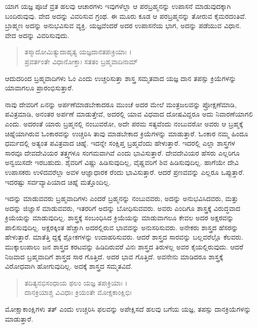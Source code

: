 ಯಾಗ ಯಜ್ಞ ಪೂಜೆ ವ್ರತ ಹಲವು ಆಚಾರಗಳು ಇವುಗಳೆಲ್ಲಾ ಆ ಪರಬ್ರಹ್ಮನನ್ನು ಉಪಾಸನೆ ಮಾಡುವುದಕ್ಕಾಗಿ ಬಂದಿರುವುವು. ವೇದ ಅದನ್ನು ವಿವರಿಸುವ ಗ್ರಂಥ. ಈ ಮೂರು ಕೂಡ ಆ ಪರಬ್ರಹ್ಮನನ್ನು ತೋರುವ ಕೈಮರದಂತಿವೆ. ಬ್ರಾಹ್ಮಣ ಅದನ್ನು ಅನುಭವಿಸುವ ವ್ಯಕ್ತಿ. ಯಜ್ಞವೆಂದರೆ ಅದರ ಉಪಾಸನೆಯ ಭಾಗ, ಅದನ್ನು ಪಡೆಯುವ ವಿಧಾನ. ವೇದ ಅದನ್ನು ವಿವರಿಸುವುದು.

\begin{verse}
ತಸ್ಮಾದೋಮಿತ್ಯುದಾಹೃತ್ಯ ಯಜ್ಞದಾನತಪಃಕ್ರಿಯಾಃ ।\\ಪ್ರವರ್ತಂತೇ ವಿಧಾನೋಕ್ತಾಃ ಸತತಂ ಬ್ರಹ್ಮವಾದಿನಾಮ್ 
\end{verse}

{\small ಆದುದರಿಂದ ಬ್ರಹ್ಮವಾದಿಗಳು ಓಂ ಎಂದು ಉಚ್ಚರಿಸುತ್ತಾ ಶಾಸ್ತ್ರ ಸಮ್ಮತವಾದ ಯಜ್ಞ ದಾನ ತಪಸ್ಸು ಕ್ರಿಯೆಗಳನ್ನು ಯಾವಾಗಲೂ ಪ್ರಾರಂಭಿಸುತ್ತಾರೆ.}

ನಾವು ದೇವರಿಗೆ ಏನನ್ನು ಅರ್ಪಣೆಮಾಡಬೇಕಾದರೂ ಮುಂಚೆ ಅದರ ಮೇಲೆ ಮಂತ್ರಜಲವನ್ನು ಪ್ರೋಕ್ಷಣೆಮಾಡಿ, ಪವಿತ್ರಮಾಡಿ, ಅನಂತರ ಅರ್ಪಣೆ ಮಾಡುತ್ತೇವೆ, ಅದರಲ್ಲಿ ಯಾವ ವಿಧವಾದ ದೋಷವಿದ್ದರೂ ಅದು ನಿವಾರಣೆಯಾಗಲಿ ಎಂದು. ಅದರಂತೆ ಯಾರು ಬ್ರಹ್ಮನಲ್ಲಿ ನಂಬುವರೋ, ಅದೇ ಪರಮ ಸತ್ಯವೆಂದು ನಂಬುವರೋ ಅವರು ಆ ಬ್ರಹ್ಮಕ್ಕೆ ಚಿಹ್ನೆಯಾಗಿರುವ ಓಂಕಾರವನ್ನು ಉಚ್ಚರಿಸಿ ತಾವು ಮಾಡಬೇಕಾದ ಕ್ರಿಯೆಗಳನ್ನು ಮಾಡುತ್ತಾರೆ. ಓಂಕಾರ ನಮ್ಮ ಹಿಂದೂ ಧರ್ಮದಲ್ಲಿ ಅತ್ಯಂತ ಪವಿತ್ರವಾದ ಚಿಹ್ನೆ. ಇದನ್ನೇ ಸಂಕ್ಷಿಪ್ತ ಬ್ರಹ್ಮವೆಂದು ಹೇಳುತ್ತಾರೆ. ಇದರಲ್ಲಿ ಎಲ್ಲಾ ಶಾಸ್ತ್ರಗಳ ಸಾರವೂ ದೇವದೇವಿಯರ ತತ್ತ್ವಗಳೂ ಸಂಗಮವಾಗಿವೆ ಎಂದು ಭಾವಿಸುತ್ತಾರೆ. ದೇವದೇವಿಯರ ಹೆಸರು ಎಲ್ಲರಿಗೂ ಅನ್ವಯಿಸದೇ ಇರಬಹುದು. ಶೈವರಿಗೆ ವಿಷ್ಣು ಹಿಡಿಸುವುದಿಲ್ಲ, ವೈಷ್ಣವರಿಗೆ ಶಿವ ಹಿಡಿಸುವುದಿಲ್ಲ. ಹಾಗೆಯೇ ದೇವಿ ಉಪಾಸಕರು ಉಳಿದವರೆಲ್ಲಾ ಅವಳ ಆಜ್ಞಾಧಾರಕ ರೆಂದು ಭಾವಿಸುತ್ತಾರೆ. ಆದರೆ ಪ್ರಣವವನ್ನು ಎಲ್ಲರೂ ಒಪ್ಪುತ್ತಾರೆ. ಇದರಷ್ಟು ಸರ್ವವ್ಯಾಪಿಯಾದ ಚಿಹ್ನೆ ಮತ್ತೊಂದಿಲ್ಲ. 

ಇದನ್ನು ಮಾಡುವವರು ಬ್ರಹ್ಮವಾದಿಗಳು ಎಂದರೆ ಬ್ರಹ್ಮನನ್ನು ನಂಬುವವರು, ಅದನ್ನು ಅನುಭವಿಸಿದವರು, ಮತ್ತು ಅದನ್ನು ಜಿಜ್ಞಾಸೆ ಮಾಡುವವರು, ಇತರರಿಗೆ ಅದನ್ನು ಬೋಧಿಸುವವರು. ಅವರು ಎಂದಿಗೂ ಶಾಸ್ತ್ರಕ್ಕೆ ವಿರುದ್ಧವಾದ ಕ್ರಿಯೆಯನ್ನು ಮಾಡುವುದಿಲ್ಲ. ಶಾಸ್ತ್ರಕ್ಕೆ ಸಂಬಂಧಿಸಿದ ಕ್ರಿಯೆಯನ್ನು ಮಾಡುವಾಗಲೂ ಕೇವಲ ಅದರ ಅಕ್ಷರವನ್ನು ಪಾಲಿಸುವುದಿಲ್ಲ. ಅಕ್ಷರಕ್ಕಿಂತ ಹೆಚ್ಚಾಗಿ ಅದರಲ್ಲಿರುವ ಭಾವವನ್ನು ಅನುಸರಿಸುವರು. ಅನೇಕರು ಶಾಸ್ತ್ರದ ಹೆಸರನ್ನು ಹೇಳುತ್ತಾರೆ. ಮಾತೆತ್ತಿ ದ್ದಕ್ಕೆ ಶ್ಲೋಕಗಳನ್ನು ಉದಾಹರಿಸುವರು. ಆದರೆ ಶಾಸ್ತ್ರದ ಸಾರವನ್ನು ಬಲ್ಲವರೆಲ್ಲೊ ಕೆಲವರು. ಮುಕ್ಕಾಲುಪಾಲು ಜನ ಶಾಸ್ತ್ರದ ಕರಟವನ್ನು ಹಿಡಿದಿರುವರೆ ವಿನಃ ಶಾಸ್ತ್ರದ ತಿರುಳಲ್ಲ ಅವರ ಕೈಯಲ್ಲಿರುವುದು. ಆದರೆ ನಿಜವಾದ ಬ್ರಹ್ಮವಾದಿಗೆ ಶಾಸ್ತ್ರದ ಸಾರ ಗೊತ್ತಿದೆ. ಅದರ ಭಾವ ಗೊತ್ತಿದೆ. ಅವನೇನು ಮಾಡಿದರೂ ಶಾಸ್ತ್ರಕ್ಕೆ ವಿರೋಧವಾಗಿ ಹೋಗುವುದಿಲ್ಲ. ಅದಕ್ಕೆ ಶಾಸ್ತ್ರದ ಸಮ್ಮತವಿದೆ.

\begin{verse}
ತದಿತ್ಯನಭಿಸಂಧಾಯ ಫಲಂ ಯಜ್ಞ ತಪಃಕ್ರಿಯಾಃ ।\\ದಾನಕ್ರಿಯಾಶ್ಚ ವಿವಿಧಾಃ ಕ್ರಿಯಂತೇ ಮೋಕ್ಷಕಾಂಕ್ಷಿಭಿಃ 
\end{verse}

{\small ಮೋಕ್ಷಾಕಾಂಕ್ಷಿಗಳು ತತ್ ಎಂದು ಉಚ್ಚರಿಸಿ ಫಲವನ್ನು ಅಪೇಕ್ಷಿಸದೆ ಹಲವು ಬಗೆಯ ಯಜ್ಞ, ತಪಸ್ಸು ದಾನಕ್ರಿಯೆಗಳನ್ನು ಮಾಡುತ್ತಾರೆ.}

